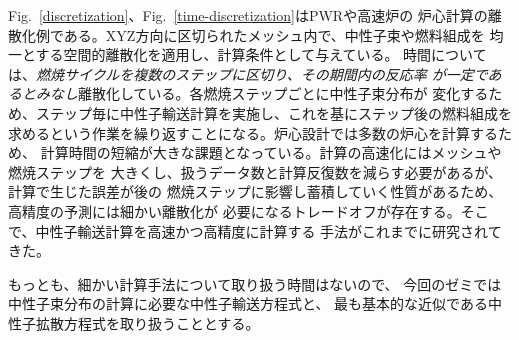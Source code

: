 Fig.~\ref{discretization}、Fig.~\ref{time-discretization}はPWRや高速炉の
炉心計算の離散化例である。XYZ方向に区切られたメッシュ内で、中性子束や燃料組成を
均一とする空間的離散化を適用し、計算条件として与えている。
時間については、\emph{燃焼サイクルを複数のステップに区切り、その期間内の反応率
が一定であるとみなし}離散化している。各燃焼ステップごとに中性子束分布が
変化するため、ステップ毎に中性子輸送計算を実施し、これを基にステップ後の燃料組成を
求めるという作業を繰り返すことになる。炉心設計では多数の炉心を計算するため、
計算時間の短縮が大きな課題となっている。計算の高速化にはメッシュや燃焼ステップを
大きくし、扱うデータ数と計算反復数を減らす必要があるが、計算で生じた誤差が後の
燃焼ステップに影響し蓄積していく性質があるため、高精度の予測には細かい離散化が
必要になるトレードオフが存在する。そこで、中性子輸送計算を高速かつ高精度に計算する
手法がこれまでに研究されてきた。

もっとも、細かい計算手法について取り扱う時間はないので、
今回のゼミでは中性子束分布の計算に必要な中性子輸送方程式と、
最も基本的な近似である中性子拡散方程式を取り扱うこととする。










